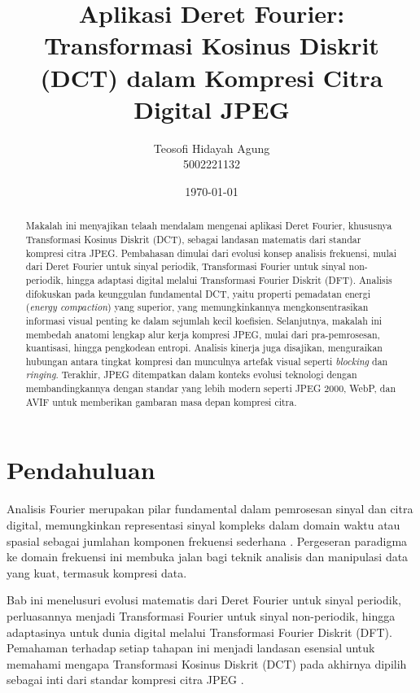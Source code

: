 \documentclass[a4paper]{article}
\title{\textbf{Aplikasi Deret Fourier: Transformasi Kosinus Diskrit (DCT) dalam Kompresi Citra Digital JPEG}}
\author{Teosofi Hidayah Agung\\5002221132}
\date{\today}
\newcommand{\keywords}[1]{%
  \begin{center}
  \textbf{\textit{Kata Kunci---}}#1
  \end{center}
}
\begin{document}
\maketitle

\begin{abstract}
  Makalah ini menyajikan telaah mendalam mengenai aplikasi Deret Fourier, khususnya Transformasi Kosinus Diskrit (DCT), sebagai landasan matematis dari standar kompresi citra JPEG. Pembahasan dimulai dari evolusi konsep analisis frekuensi, mulai dari Deret Fourier untuk sinyal periodik, Transformasi Fourier untuk sinyal non-periodik, hingga adaptasi digital melalui Transformasi Fourier Diskrit (DFT). Analisis difokuskan pada keunggulan fundamental DCT, yaitu properti pemadatan energi (\textit{energy compaction}) yang superior, yang memungkinkannya mengkonsentrasikan informasi visual penting ke dalam sejumlah kecil koefisien. Selanjutnya, makalah ini membedah anatomi lengkap alur kerja kompresi JPEG, mulai dari pra-pemrosesan, kuantisasi, hingga pengkodean entropi. Analisis kinerja juga disajikan, menguraikan hubungan antara tingkat kompresi dan munculnya artefak visual seperti \textit{blocking} dan \textit{ringing}. Terakhir, JPEG ditempatkan dalam konteks evolusi teknologi dengan membandingkannya dengan standar yang lebih modern seperti JPEG 2000, WebP, dan AVIF untuk memberikan gambaran masa depan kompresi citra.
\end{abstract}


\section{Pendahuluan}
Analisis Fourier merupakan pilar fundamental dalam pemrosesan sinyal dan citra digital, memungkinkan representasi sinyal kompleks dalam domain waktu atau spasial sebagai jumlahan komponen frekuensi sederhana \cite{oppenheim1996signals}. Pergeseran paradigma ke domain frekuensi ini membuka jalan bagi teknik analisis dan manipulasi data yang kuat, termasuk kompresi data.

Bab ini menelusuri evolusi matematis dari Deret Fourier untuk sinyal periodik, perluasannya menjadi Transformasi Fourier untuk sinyal non-periodik, hingga adaptasinya untuk dunia digital melalui Transformasi Fourier Diskrit (DFT). Pemahaman terhadap setiap tahapan ini menjadi landasan esensial untuk memahami mengapa Transformasi Kosinus Diskrit (DCT) pada akhirnya dipilih sebagai inti dari standar kompresi citra JPEG \cite{wallace1991jpeg}.
\end{document}
